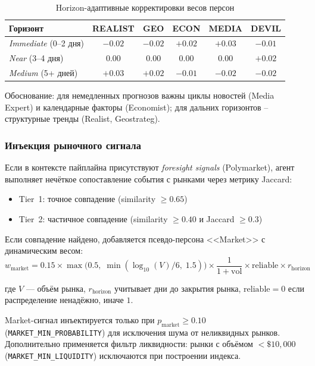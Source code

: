 \begin{table}[h]
  \centering
  \caption{Horizon-адаптивные корректировки весов персон}
  \label{tab:horizon-weights}
  \begin{tabular}{|l|c|c|c|c|c|}
    \hline
    \textbf{Горизонт} & \textbf{REALIST} & \textbf{GEO} & \textbf{ECON} & \textbf{MEDIA} & \textbf{DEVIL} \\
    \hline
    \emph{Immediate} (0--2 дня) & $-0.02$ & $-0.02$ & $+0.02$ & $+0.03$ & $-0.01$ \\
    \hline
    \emph{Near} (3--4 дня) & $0.00$ & $0.00$ & $0.00$ & $0.00$ & $+0.02$ \\
    \hline
    \emph{Medium} (5+ дней) & $+0.03$ & $+0.02$ & $-0.01$ & $-0.02$ & $-0.02$ \\
    \hline
  \end{tabular}
\end{table}

Обоснование: для немедленных прогнозов важны циклы новостей (Media Expert) и календарные факторы (Economist); для дальних горизонтов -- структурные тренды (Realist, Geostrateg).

\subsubsection{Инъекция рыночного сигнала}

Если в контексте пайплайна присутствуют \emph{foresight signals} (Polymarket), агент выполняет нечёткое сопоставление события с рынками через метрику Jaccard:
\begin{itemize}
  \item Tier~1: точное совпадение (similarity $\geq 0.65$)
  \item Tier~2: частичное совпадение (similarity $\geq 0.40$ и Jaccard $\geq 0.3$)
\end{itemize}

Если совпадение найдено, добавляется псевдо-персона <<Market>> с динамическим весом:
\[
w_{\text{market}} = 0.15 \times \max\!\bigl(0.5,\; \min(\log_{10}(V)/6,\; 1.5)\bigr) \times \frac{1}{1 + \text{vol}} \times \text{reliable} \times r_{\text{horizon}}
\]

где $V$ --- объём рынка, $r_{\text{horizon}}$ учитывает дни до закрытия рынка, $\text{reliable} = 0$ если распределение ненадёжно, иначе $1$.

Market-сигнал инъектируется только при $p_{\text{market}} \geq 0.10$ (\texttt{MARKET\_MIN\_PROBABILITY}) для исключения шума от неликвидных рынков. Дополнительно применяется фильтр ликвидности: рынки с объёмом $< \$10{,}000$ (\texttt{MARKET\_MIN\_LIQUIDITY}) исключаются при построении индекса.

